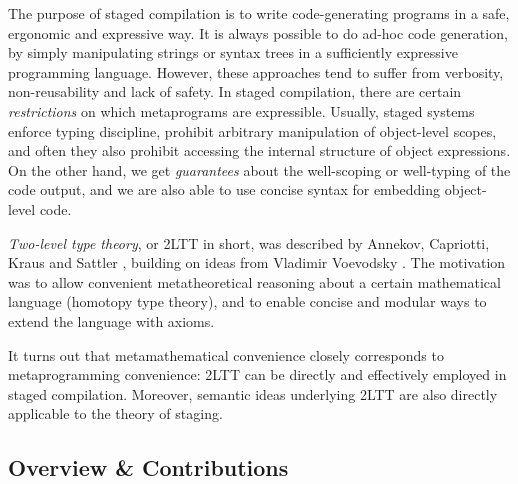 \documentclass[acmsmall,anonymous,review]{acmart}
\theoremstyle{remark}
\begin{document}
The purpose of staged compilation is to write code-generating programs in a
safe, ergonomic and expressive way. It is always possible to do ad-hoc code
generation, by simply manipulating strings or syntax trees in a sufficiently
expressive programming language. However, these approaches tend to suffer from
verbosity, non-reusability and lack of safety. In staged compilation, there are
certain \emph{restrictions} on which metaprograms are expressible. Usually,
staged systems enforce typing discipline, prohibit arbitrary manipulation of
object-level scopes, and often they also prohibit accessing the internal
structure of object expressions. On the other hand, we get \emph{guarantees}
about the well-scoping or well-typing of the code output, and we are also able
to use concise syntax for embedding object-level code.

\emph{Two-level type theory}, or 2LTT in short, was described by Annekov,
Capriotti, Kraus and Sattler \cite{twolevel}, building on ideas from Vladimir
Voevodsky \cite{hts}. The motivation was to allow convenient metatheoretical
reasoning about a certain mathematical language (homotopy type theory), and to
enable concise and modular ways to extend the language with axioms.

It turns out that metamathematical convenience closely corresponds to
metaprogramming convenience: 2LTT can be directly and effectively employed in
staged compilation. Moreover, semantic ideas underlying 2LTT are also directly
applicable to the theory of staging.

\subsection{Overview \& Contributions}\label{sec:overview}
\end{document}
